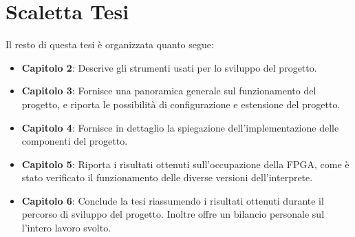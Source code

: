 \section{Scaletta Tesi}
Il resto di questa tesi è organizzata quanto segue: 
\begin{itemize}
    \item \textbf{Capitolo 2}: Descrive gli strumenti usati per lo sviluppo del progetto.
    \item \textbf{Capitolo 3}: Fornisce una panoramica generale sul funzionamento del progetto, e riporta le possibilità di configurazione e estensione del progetto.
    \item \textbf{Capitolo 4}: Fornisce in dettaglio la spiegazione dell'implementazione delle componenti del progetto.
    \item \textbf{Capitolo 5}: Riporta i risultati ottenuti sull'occupazione della FPGA, come è stato verificato il funzionamento delle diverse versioni dell'interprete.
    \item \textbf{Capitolo 6}: Conclude la tesi riassumendo i risultati ottenuti durante il percorso di sviluppo del progetto. Inoltre offre un bilancio personale sul l'intero lavoro svolto.
\end{itemize}